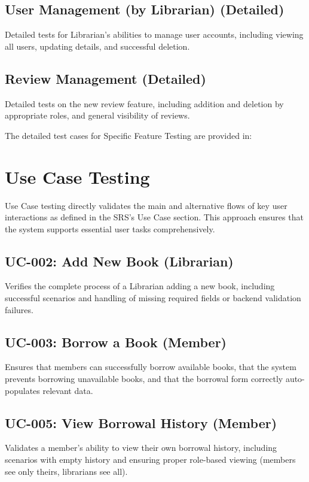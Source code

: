 \subsection{User Management (by Librarian) (Detailed)}
Detailed tests for Librarian's abilities to manage user accounts, including viewing all users, updating details, and successful deletion.

\subsection{Review Management (Detailed)}
Detailed tests on the new review feature, including addition and deletion by appropriate roles, and general visibility of reviews.

The detailed test cases for Specific Feature Testing are provided in:


\section{Use Case Testing}
Use Case testing directly validates the main and alternative flows of key user interactions as defined in the SRS's Use Case section. This approach ensures that the system supports essential user tasks comprehensively.

\subsection{UC-002: Add New Book (Librarian)}
Verifies the complete process of a Librarian adding a new book, including successful scenarios and handling of missing required fields or backend validation failures.

\subsection{UC-003: Borrow a Book (Member)}
Ensures that members can successfully borrow available books, that the system prevents borrowing unavailable books, and that the borrowal form correctly auto-populates relevant data.

\subsection{UC-005: View Borrowal History (Member)}
Validates a member's ability to view their own borrowal history, including scenarios with empty history and ensuring proper role-based viewing (members see only theirs, librarians see all).

